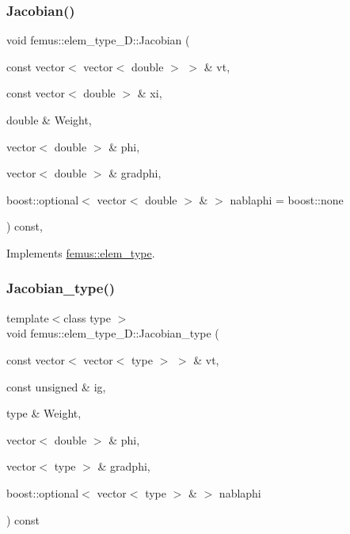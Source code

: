 \subsubsection{\texorpdfstring{Jacobian()}{Jacobian()}\hspace{0.1cm}{\footnotesize\ttfamily [4/4]}}
{\footnotesize\ttfamily void femus\+::elem\+\_\+type\+\_\+D\+::\+Jacobian (\begin{DoxyParamCaption}\item[{const vector$<$ vector$<$ double $>$ $>$ \&}]{vt,  }\item[{const vector$<$ double $>$ \&}]{xi,  }\item[{double \&}]{Weight,  }\item[{vector$<$ double $>$ \&}]{phi,  }\item[{vector$<$ double $>$ \&}]{gradphi,  }\item[{boost\+::optional$<$ vector$<$ double $>$ \& $>$}]{nablaphi = {\ttfamily boost\+:\+:none} }\end{DoxyParamCaption}) const\hspace{0.3cm}{\ttfamily [inline]}, {\ttfamily [virtual]}}



Implements \mbox{\hyperlink{classfemus_1_1elem__type_aab6db5851a9810adfe0ff98df2c30810}{femus\+::elem\+\_\+type}}.

\mbox{\label{classfemus_1_1elem__type__3_d_a8188e7f5aea4cbc3c6ad70d5b14aab4c}} 
\subsubsection{\texorpdfstring{Jacobian\+\_\+type()}{Jacobian\_type()}\hspace{0.1cm}{\footnotesize\ttfamily [1/2]}}
{\footnotesize\ttfamily template$<$class type $>$ \\
void femus\+::elem\+\_\+type\+\_\+D\+::\+Jacobian\+\_\+type (\begin{DoxyParamCaption}\item[{const vector$<$ vector$<$ type $>$ $>$ \&}]{vt,  }\item[{const unsigned \&}]{ig,  }\item[{type \&}]{Weight,  }\item[{vector$<$ double $>$ \&}]{phi,  }\item[{vector$<$ type $>$ \&}]{gradphi,  }\item[{boost\+::optional$<$ vector$<$ type $>$ \& $>$}]{nablaphi }\end{DoxyParamCaption}) const}


